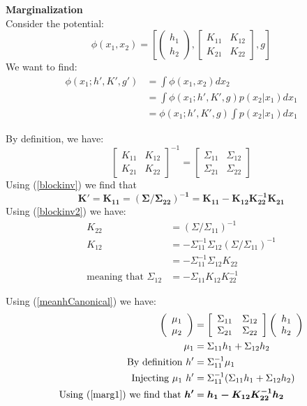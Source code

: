 \documentclass[11pt]{article}
\newcommand{\subsubsubsection}[1]{\noindent\textbf{#1}\\}
\begin{document}
\subsubsubsection{Marginalization}
Consider the potential:
$$
\phi(x_1, x_2) = \left[ \left( \begin{array}{c} h_1 \\ h_2 \end{array} \right), \left[ \begin{array}{cc} K_{11} & K_{12} \\ K_{21} & K_{22} \end{array} \right], g \right]
$$
We want to find:
\begin{align*}
\phi(x_1; h', K', g') &= \int \phi(x_1, x_2)dx_2\\
&= \int \phi(x_1; h', K', g)p(x_2|x_1)dx_1\\
&= \phi(x_1; h', K', g)\int p(x_2|x_1)dx_1
\end{align*}

By definition, we have:
$$
\left[ \begin{array}{cc} K_{11} & K_{12} \\ K_{21} & K_{22} \end{array} \right]^{-1} = \left[ \begin{array}{cc} \Sigma_{11} & \Sigma_{12} \\ \Sigma_{21} & \Sigma_{22} \end{array} \right]
$$
Using (\ref{blockinv}) we find that 
$$\bm{K'=K_{11}=(\Sigma/\Sigma_{22})^{-1} = K_{11}-K_{12}K_{22}^{-1}K_{21}}$$
Using (\ref{blockinv2}) we have:
\begin{align}
K_{22} &= (\Sigma/\Sigma_{11})^{-1}\nonumber\\
K_{12} &= - \Sigma_{11}^{-1}\Sigma_{12}(\Sigma/\Sigma_{11})^{-1}\nonumber\\
&= - \Sigma_{11}^{-1}\Sigma_{12}K_{22}\nonumber\\
\text{meaning~that~} \Sigma_{12} &= -\Sigma_{11}K_{12}K_{22}^{-1}\label{marg1}
\end{align}

Using (\ref{meanhCanonical}) we have:
\begin{align*}
\left( \begin{array}{c} \mu_1 \\ \mu_2 \end{array} \right) &=
\left[ \begin{array}{cc} \Sigma_{11} & \Sigma_{12} \\ \Sigma_{21} & \Sigma_{22} \end{array} \right] \left( \begin{array}{c} h_1 \\ h_2 \end{array} \right) \\
\mu_1 &= \Sigma_{11}h_1 +  \Sigma_{12}h_2\\
\text{By definition~}h'&= \Sigma_{11}^{-1}\mu_1 \\
\text{Injecting~}\mu_1~h' &=\Sigma_{11}^{-1}(\Sigma_{11}h_1 +  \Sigma_{12}h_2)\\
\text{Using (\ref{marg1}) we find that~}\bm{h'} &= \bm{h_1 -K_{12}K_{22}^{-1}h_2}
\end{align*}
\end{document}
